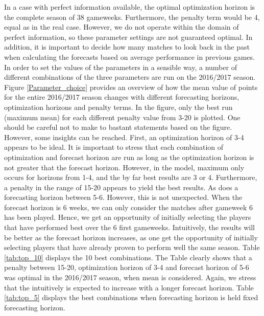 In a case with perfect information available, the optimal optimization horizon is the complete season of 38 gameweeks. Furthermore, the penalty term would be 4, equal as in the real case. However, we do not operate within the domain of perfect information, so these parameter settings are not guaranteed optimal. In addition, it is important to decide how many matches to look back in the past when calculating the forecasts based on average performance in previous games.
\newpar 
In order to set the values of the parameters in a sensible way, a number of different combinations of the three parameters are run on the 2016/2017 season. Figure \ref{Parameter_choice} provides an overview of how the mean value of points for the entire 2016/2017 season changes with different forecasting horizons, optimization horizons and penalty terms. In the figure, only the best run (maximum mean) for each different penalty value from 3-20 is plotted. One should be careful not to make to bastant statements based on the figure. However, some insights can be reached. First, an optimization horizon of 3-4 appears to  be ideal. It is important to stress that each combination of optimization and forecast horizon are run as long as the optimization horizon is not greater that the forecast horizon. However, in the model, maximum only occurs for horizons from 1-4, and the by far best results are 3 or 4. Furthermore, a penalty in the range of 15-20 appears to yield the best results. As does a forecasting horizon between 5-6. However, this is not unexpected. When the forecast horizon is 6 weeks, we can only consider the matches after gameweek 6 has been played. Hence, we get an opportunity of initially selecting the players that have performed best over the 6 first gameweeks. Intuitively, the results will be better as the forecast horizon increases, as one get the opportunity of initially selecting players that have already proven to perform well the same season. Table \ref{tab:top_10} displays the 10 best combinations. The Table clearly shows that a penalty between 15-20, optimization horizon of 3-4 and forecast horizon of 5-6 was optimal in the 2016/2017 season, when mean is considered. Again, we stress that the intuitively is expected to increase with a longer forecast horizon. Table \ref{tab:top_5} displays the best combinations when forecasting horizon is held fixed forecasting horizon. 

